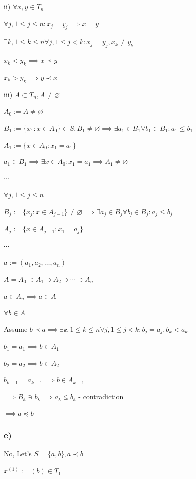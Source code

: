 \documentclass{article}
\begin{document}
ii) $\forall x, y \in T_n$

\item $\forall j, 1 \leq j \leq n: x_j=y_j \implies x=y$
\item $\exists k, 1 \leq k \leq n \forall j, 1 \leq j < k: x_j = y_j, x_k \neq y_k$
\item $x_k < y_k \implies x \prec y$
\item $x_k > y_k \implies y \prec x$

iii) $A \subset T_n, A \neq \varnothing$

$A_0 := A \neq \varnothing$

$B_1 := \{ x_1: x \in A_0 \} \subset S, B_1 \neq \varnothing \implies \exists a_1 \in B_1 \forall b_1 \in B_1: a_1 \leq b_1$

$A_1 := \{ x \in A_0: x_1 = a_1 \}$

$a_1 \in B_1 \implies \exists x \in A_0: x_1 = a_1 \implies A_1 \neq \varnothing$

$\cdots$

$\forall j, 1 \leq j \leq n$

$B_j := \{ x_j: x \in A_{j-1} \} \neq \varnothing \implies \exists a_j \in B_j \forall b_j \in B_j: a_j \leq b_j$

$A_j := \{ x \in A_{j-1}: x_1 = a_j \}$

$\cdots$

$a := (a_1, a_2, \ldots, a_n)$

$A=A_0 \supset A_1 \supset A_2 \supset \cdots \supset A_n$

$a \in A_n \implies a \in A$

$\forall b \in A$

Assume $b \prec a \implies \exists k, 1 \leq k \leq n \forall j, 1\leq j < k: b_j = a_j, b_k < a_k$

$b_1 = a_1 \implies b \in A_1$

$b_2 = a_2 \implies b \in A_2$

$b_{k-1} = a_{k-1} \implies b \in A_{k-1}$

$\implies B_k \ni b_k \implies a_k \leq b_k$ - contradiction

$\implies a \preceq b$

\subsubsection*{e)}

No, Let's $S = \{ a, b \}, a \prec b$

$x^{(1)} := (b) \in T_1$
\end{document}
